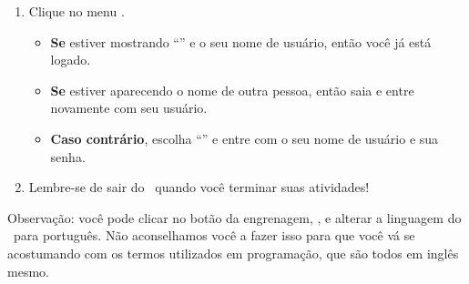 \begin{enumerate}[resume]
\item Clique no menu .
      \begin{itemize}
      \item \textbf{Se} estiver mostrando ``'' e o seu nome de
            usuário, então você já está logado.
      \item \textbf{Se} estiver aparecendo o nome de outra pessoa, então saia
            e entre novamente com seu usuário.
      \item \textbf{Caso contrário}, escolha ``'' e entre com o
            seu nome de usuário e sua senha.
      \end{itemize}
\item Lembre-se de sair do \snap\ quando você terminar suas atividades!
\end{enumerate}

Observação: você pode clicar no botão da engrenagem,
, e alterar a linguagem do \snap\ para
português. Não aconselhamos você a fazer isso para que você vá se acostumando
com os termos utilizados em programação, que são todos em inglês mesmo.
